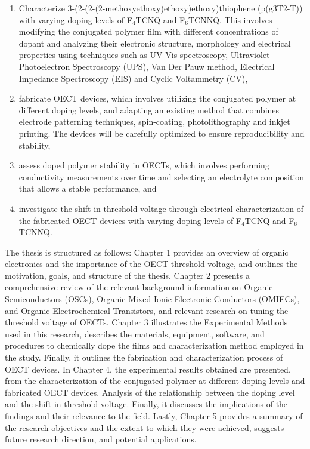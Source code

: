 \begin{enumerate}
\item Characterize 3-(2-(2-(2-methoxyethoxy)ethoxy)ethoxy)thiophene (p(g3T2-T)) with varying doping levels of F$_{4}$TCNQ and F$_{6}$TCNNQ. This involves modifying the conjugated polymer film with different concentrations of dopant and analyzing their electronic structure, morphology and electrical properties using techniques such as UV-Vis spectroscopy, Ultraviolet Photoelectron Spectroscopy (UPS), %
Van Der Pauw method, Electrical Impedance Spectroscopy (EIS) and Cyclic Voltammetry (CV),

\item fabricate OECT devices, which involves utilizing the conjugated polymer at different doping levels, and adapting an existing method that combines electrode patterning techniques, spin-coating, photolithography and inkjet printing. The devices will be carefully optimized to ensure reproducibility and stability,
 
\item assess doped polymer stability in OECTs, which involves performing conductivity measurements over time and selecting an electrolyte composition that allows a stable performance, and
 
\item investigate the shift in threshold voltage through electrical characterization of the fabricated OECT devices with varying doping levels of F$_{4}$TCNQ and F$_{6}$TCNNQ.


\end{enumerate}

The thesis is structured as follows: Chapter 1 provides an overview of organic electronics and the importance of the OECT threshold voltage, and outlines the motivation, goals, and structure of the thesis. Chapter 2 presents a comprehensive review of the relevant background information on Organic Semiconductors (OSCs), Organic Mixed Ionic Electronic Conductors (OMIECs), and Organic Electrochemical Transistors, and relevant research on tuning the threshold voltage of OECTs. Chapter 3 illustrates the Experimental Methods used in this research, describes the materials, equipment, software, and procedures to chemically dope the films and characterization method employed in the study. Finally, it outlines the fabrication and characterization process of OECT devices. In Chapter 4, the experimental results obtained are presented, from the characterization of the conjugated polymer at different doping levels and fabricated OECT devices. Analysis of the relationship between the doping level and the shift in threshold voltage. Finally, it discusses the implications of the findings and their relevance to the field. Lastly, Chapter 5 provides a summary of the research objectives and the extent to which they were achieved, suggests future research direction, and potential applications.

